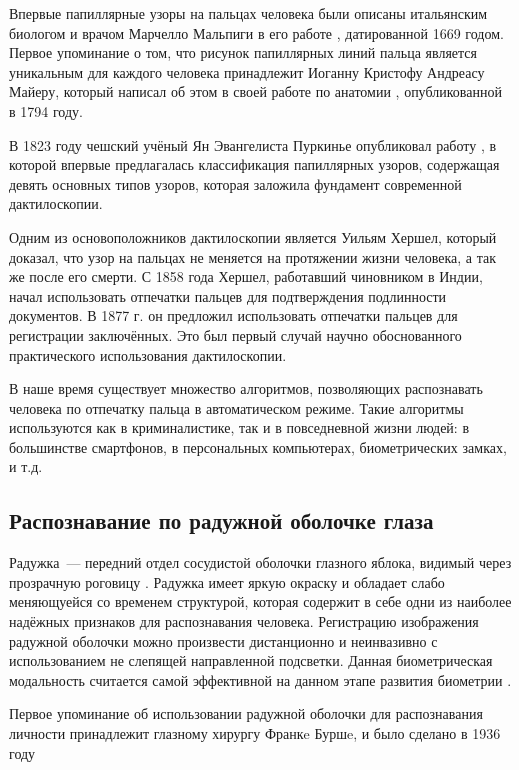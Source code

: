 \documentclass[14pt, a4paper]{extarticle}
\begin{document}
Впервые папиллярные узоры на пальцах человека были описаны итальянским биологом и врачом Марчелло Мальпиги в его работе \cite{malpighi1669opera}, датированной 1669 годом. Первое упоминание о том, что рисунок папиллярных линий пальца является уникальным для каждого человека принадлежит Иоганну Кристофу Андреасу Майеру, который написал об этом в своей работе по анатомии \cite{mayer1794anatomische}, опубликованной в 1794 году. 

В 1823 году чешский учёный Ян Эвангелиста Пуркинье опубликовал работу \cite{purkynve2013dissertation}, в которой впервые предлагалась классификация папиллярных узоров, содержащая девять основных типов узоров, которая заложила фундамент современной дактилоскопии. 

Одним из основоположников дактилоскопии является Уильям Хершел, который доказал, что узор на пальцах не меняется на протяжении жизни человека, а так же после его смерти. С 1858 года Хершел, работавший чиновником в Индии, начал использовать отпечатки пальцев для подтверждения подлинности документов. В 1877 г. он предложил использовать отпечатки пальцев для регистрации заключённых. Это был первый случай научно обоснованного практического использования дактилоскопии.

В наше время существует множество алгоритмов, позволяющих распознавать человека по отпечатку пальца в автоматическом режиме. Такие алгоритмы используются как в криминалистике, так и в повседневной жизни людей: в большинстве смартфонов, в персональных компьютерах, биометрических замках, и т.д.

\subsection{Распознавание по радужной оболочке глаза}
Радужка~--- передний отдел сосудистой оболочки глазного яблока, видимый через прозрачную роговицу \cite{petrovskiy1974bme}. Радужка имеет яркую окраску и обладает слабо меняющуейся со временем структурой, которая содержит в себе одни из наиболее надёжных признаков для распознавания человека. Регистрацию изображения радужной оболочки можно произвести дистанционно и неинвазивно с использованием не слепящей направленной подсветки. Данная биометрическая модальность считается самой эффективной на данном этапе развития биометрии \cite{gupta2011iris}.

Первое упоминание об использовании радужной оболочки для распознавания личности принадлежит глазному хирургу Франкe Буршe, и было сделано в 1936 году \cite{misztal2012iris}
\end{document}
